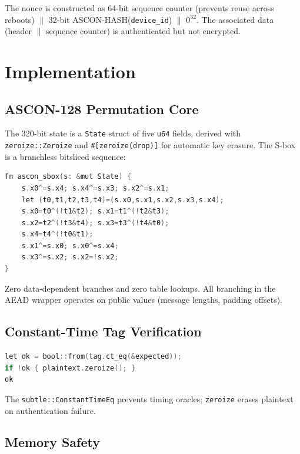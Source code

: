 \documentclass[anonymous]{ndss}
\newcommand{\code}[1]{\mbox{\texttt{#1}}}
\begin{document}
The nonce is constructed as 64-bit sequence counter (prevents reuse across
reboots) $\|$ 32-bit ASCON-HASH(\texttt{device\_id}) $\|$ $0^{32}$. The
associated data (header $\|$ sequence counter) is authenticated but not
encrypted.

\section{Implementation}
\label{sec:impl}

\subsection{ASCON-128 Permutation Core}

The 320-bit state is a \texttt{State} struct of five \texttt{u64} fields,
derived with \code{zeroize::Zeroize} and \code{\#[zeroize(drop)]} for
automatic key erasure. The S-box is a branchless bitsliced sequence:

\begin{lstlisting}[language=C,caption={Bitsliced ASCON S-box (\texttt{lib.rs}).}]
fn ascon_sbox(s: &mut State) {
    s.x0^=s.x4; s.x4^=s.x3; s.x2^=s.x1;
    let (t0,t1,t2,t3,t4)=(s.x0,s.x1,s.x2,s.x3,s.x4);
    s.x0=t0^(!t1&t2); s.x1=t1^(!t2&t3);
    s.x2=t2^(!t3&t4); s.x3=t3^(!t4&t0);
    s.x4=t4^(!t0&t1);
    s.x1^=s.x0; s.x0^=s.x4;
    s.x3^=s.x2; s.x2=!s.x2;
}
\end{lstlisting}

Zero data-dependent branches and zero table lookups. All branching in the
AEAD wrapper operates on public values (message lengths, padding offsets).

\subsection{Constant-Time Tag Verification}

\begin{lstlisting}[language=C,caption={Constant-time tag check and zeroize.}]
let ok = bool::from(tag.ct_eq(&expected));
if !ok { plaintext.zeroize(); }
ok
\end{lstlisting}

The \code{subtle::ConstantTimeEq} prevents timing oracles; \texttt{zeroize}
erases plaintext on authentication failure.

\subsection{Memory Safety}
\end{document}
